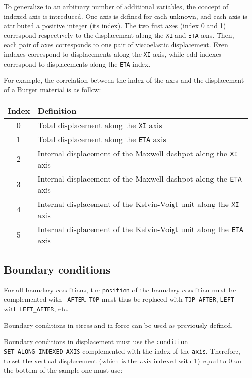 \documentclass[10pt]{article}
\begin{document}
To generalize to an arbitrary number of additional variables, the concept of indexed axis is introduced. One axis is defined for each unknown, and each axis is attributed a positive integer (its index). The two first axes (index 0 and 1) correspond respectively to the displacement along the \verb+XI+ and \verb+ETA+ axis. Then, each pair of axes corresponds to one pair of viscoelastic displacement. Even indexes correspond to displacements along the \verb+XI+ axis, while odd indexes correspond to displacements along the \verb+ETA+ index.

For example, the correlation between the index of the axes and the displacement of a Burger material is as follow:

\begin{table}[h!]
\begin{center}
\begin{tabular}{cl}
\hline
Index & Definition \\
\hline
0 & Total displacement along the \verb+XI+ axis \\
1 & Total displacement along the \verb+ETA+ axis \\
2 & Internal displacement of the Maxwell dashpot along the \verb+XI+ axis \\
3 & Internal displacement of the Maxwell dashpot along the \verb+ETA+ axis \\
4 & Internal displacement of the Kelvin-Voigt unit along the \verb+XI+ axis \\
5 & Internal displacement of the Kelvin-Voigt unit along the \verb+ETA+ axis \\
\hline
\end{tabular}
\end{center}
\end{table}

\subsection{Boundary conditions}

For all boundary conditions, the \verb+position+ of the boundary condition must be complemented with \verb+_AFTER+. \verb+TOP+ must thus be replaced with \verb+TOP_AFTER+, \verb+LEFT+ with \verb+LEFT_AFTER+, etc.

Boundary conditions in stress and in force can be used as previously defined.

Boundary conditions in displacement must use the \verb+condition+ \verb+SET_ALONG_INDEXED_AXIS+ complemented with the index of the \verb+axis+. Therefore, to set the vertical displacement (which is the axis indexed with 1) equal to 0 on the bottom of the sample one must use:\\
\end{document}
